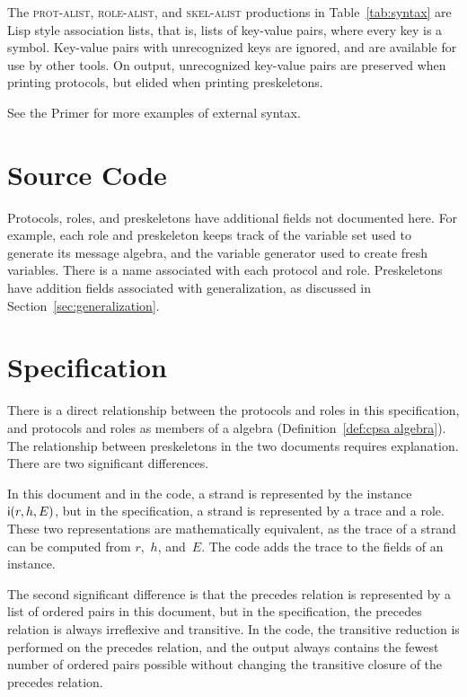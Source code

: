 \documentclass[12pt]{report}
\theoremstyle{definition}
\begin{document}
The \textsc{prot-alist}, \textsc{role-alist}, and \textsc{skel-alist}
productions in Table~\ref{tab:syntax} are Lisp style association lists,
that is, lists of key-value pairs, where every key is a symbol.
Key-value pairs with unrecognized keys are ignored, and are available
for use by other tools.  On output, unrecognized key-value pairs are
preserved when printing protocols, but elided when printing
preskeletons.

See the {\cpsa} Primer for more examples of {\cpsa} external syntax.

\section{Source Code}\label{sec:source code}

Protocols, roles, and preskeletons have additional fields not
documented here.  For example, each role and preskeleton keeps track
of the variable set used to generate its message algebra, and the
variable generator used to create fresh variables.  There is a name
associated with each protocol and role.  Preskeletons have addition
fields associated with generalization, as discussed in
Section~\ref{sec:generalization}.

\section{Specification}\label{sec:specification}

There is a direct relationship between the protocols and roles in this
specification, and protocols and roles as members of a {\cpsa} algebra
(Definition~\ref{def:cpsa algebra}).  The relationship between
preskeletons in the two documents requires explanation.  There are two
significant differences.

In this document and in the code, a strand is represented by the
instance $\operatorname{\mathsf{i}}(r,h,E)$, but in the specification, a strand is
represented by a trace and a role.  These two representations are
mathematically equivalent, as the trace of a strand can be computed
from $r$,~$h$, and~$E$.  The code adds the trace to the fields of an
instance.

The second significant difference is that the precedes relation is
represented by a list of ordered pairs in this document, but in the
specification, the precedes relation is always irreflexive and
transitive.  In the code, the transitive reduction is performed on the
precedes relation, and the output always contains the fewest number of
ordered pairs possible without changing the transitive closure of the
precedes relation.
\end{document}
